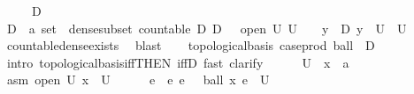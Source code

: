 \begin{isabellebody}
\ \ \ \ \ {\isachardoublequoteopen}D\ {\isasymnoteq}\ {\isacharbraceleft}{\kern0pt}{\isacharbraceright}{\kern0pt}{\isachardoublequoteclose}\ \ \ \ \isanewline
%
\isadelimproof
%
\endisadelimproof
%
\isatagproof
{}\isamarkupfalse%
\ {\isacharminus}{\kern0pt}\isanewline
\ \ \isamarkupfalse%
\ D\ {\isacharcolon}{\kern0pt}{\isacharcolon}{\kern0pt}\ {\isachardoublequoteopen}{\isacharprime}{\kern0pt}a\ set{\isachardoublequoteclose}\ \ dense{\isacharunderscore}{\kern0pt}subset{\isacharcolon}{\kern0pt}\ {\isachardoublequoteopen}countable\ D{\isachardoublequoteclose}\ {\isachardoublequoteopen}D\ {\isasymnoteq}\ {\isacharbraceleft}{\kern0pt}{\isacharbraceright}{\kern0pt}{\isachardoublequoteclose}\ {\isachardoublequoteopen}{\isasymlbrakk}open\ U{\isacharsemicolon}{\kern0pt}\ U\ {\isasymnoteq}\ {\isacharbraceleft}{\kern0pt}{\isacharbraceright}{\kern0pt}{\isasymrbrakk}\ {\isasymLongrightarrow}\ {\isasymexists}y\ {\isasymin}\ D{\isachardot}{\kern0pt}\ y\ {\isasymin}\ U{\isachardoublequoteclose}\ \ U\ \isamarkupfalse%
\ countable{\isacharunderscore}{\kern0pt}dense{\isacharunderscore}{\kern0pt}exists\ \isamarkupfalse%
\ blast\isanewline
\ \ \isamarkupfalse%
\ {\isachardoublequoteopen}topological{\isacharunderscore}{\kern0pt}basis\ {\isacharparenleft}{\kern0pt}case{\isacharunderscore}{\kern0pt}prod\ ball\ {\isacharbackquote}{\kern0pt}\ {\isacharparenleft}{\kern0pt}D\ {\isasymtimes}\ {\isacharparenleft}{\kern0pt}{\isasymrat}\ {\isasyminter}\ {\isacharbraceleft}{\kern0pt}{}{\isacharless}{\kern0pt}{\isachardot}{\kern0pt}{\isachardot}{\kern0pt}{\isacharbraceright}{\kern0pt}{\isacharparenright}{\kern0pt}{\isacharparenright}{\kern0pt}{\isacharparenright}{\kern0pt}{\isachardoublequoteclose}\isanewline
\ \ \isamarkupfalse%
\ {\isacharparenleft}{\kern0pt}intro\ topological{\isacharunderscore}{\kern0pt}basis{\isacharunderscore}{\kern0pt}iff{\isacharbrackleft}{\kern0pt}THEN\ iffD{}{\isacharbrackright}{\kern0pt}{\isacharcomma}{\kern0pt}\ fast{\isacharcomma}{\kern0pt}\ clarify{\isacharparenright}{\kern0pt}\isanewline
\ \ \ \ \isamarkupfalse%
\ U\ \ x\ {\isacharcolon}{\kern0pt}{\isacharcolon}{\kern0pt}\ {\isacharprime}{\kern0pt}a\ \isamarkupfalse%
\ asm{\isacharcolon}{\kern0pt}\ {\isachardoublequoteopen}open\ U{\isachardoublequoteclose}\ {\isachardoublequoteopen}x\ {\isasymin}\ U{\isachardoublequoteclose}\isanewline
\ \ \ \ \isamarkupfalse%
\ e\ \ e{\isacharcolon}{\kern0pt}\ {\isachardoublequoteopen}e\ {\isachargreater}{\kern0pt}\ {}{\isachardoublequoteclose}\ {\isachardoublequoteopen}ball\ x\ e\ {\isasymsubseteq}\ U{\isachardoublequoteclose}\ \isamarkupfalse%

\end{isabellebody}
